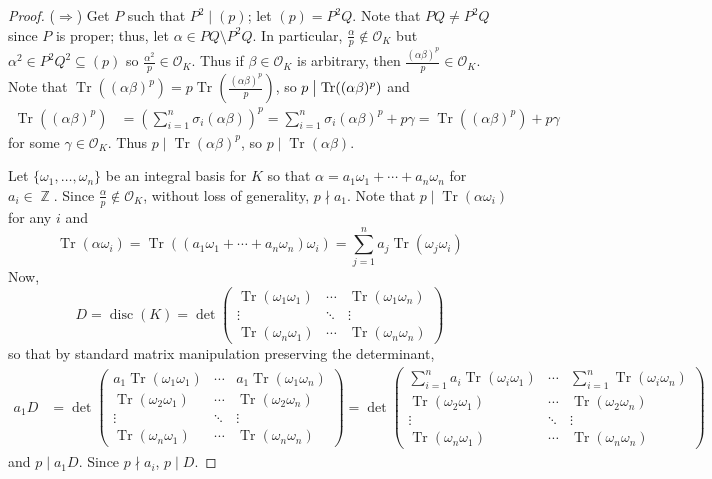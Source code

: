 \documentclass[11pt, a4paper]{memoir}
\DeclareMathOperator{\Z}{{\mathbb{Z}}}
\newcommand{\impr}{{($\Rightarrow$)\hspace{0.2cm}}}
\renewcommand{\div}{\bigm|}
\theoremstyle{change}
\theoremstyle{plain}
\theoremstyle{nonumberplain}
\newtheorem{proof}{Proof}
\DeclareMathOperator{\disc}{disc}
\DeclareMathOperator{\Tr}{Tr}
\numberwithin{equation}{section}
\begin{document}
\begin{proof}
    \impr
    Get $P$ such that $P^2\mid(p)$; let $(p)=P^2Q$.
    Note that $PQ\neq  P^2Q$ since $P$ is proper; thus, let $\alpha\in PQ\setminus P^2Q$.
    In particular, $\frac{\alpha}{p}\notin\mathcal{O}_K$ but $\alpha^2\in P^2Q^2\subseteq (p)$ so $\frac{\alpha^2}{p}\in\mathcal{O}_K$.
    Thus if $\beta\in\mathcal{O}_K$ is arbitrary, then $\frac{(\alpha\beta)^p}{p}\in\mathcal{O}_K$.
    Note that $\Tr((\alpha\beta)^p)=p\Tr\left(\frac{(\alpha\beta)^p}{p}\right)$, so $p\div \Tr((\alpha\beta)^p)$ and
    \begin{align*}
        \Tr\left((\alpha\beta)^p\right) &=\left(\sum_{i=1}^n\sigma_i(\alpha\beta)\right)^p=\sum_{i=1}^n\sigma_i(\alpha\beta)^p+p\gamma= \Tr((\alpha\beta)^p)+p\gamma
    \end{align*}
    for some $\gamma\in\mathcal{O}_K$.
    Thus $p\mid\Tr(\alpha\beta)^p$, so $p\mid\Tr(\alpha\beta)$.

    Let $\{\omega_1,\ldots,\omega_n\}$ be an integral basis for $K$ so that $\alpha=a_1\omega_1+\cdots+a_n\omega_n$ for $a_i\in\Z$.
    Since $\frac{\alpha}{p}\notin\mathcal{O}_K$, without loss of generality, $p\nmid a_1$.
    Note that $p\mid\Tr(\alpha\omega_i)$ for any $i$ and
    \begin{equation*}
        \Tr(\alpha\omega_i)=\Tr((a_1\omega_1+\cdots+a_n\omega_n)\omega_i)=\sum_{j=1}^n a_j\Tr(\omega_j\omega_i)
    \end{equation*}
    Now,
    \begin{equation*}
        D=\disc(K)=\det
        \begin{pmatrix}
            \Tr(\omega_1\omega_1) &\cdots&\Tr(\omega_1\omega_n)\\
            \vdots&\ddots&\vdots\\
            \Tr(\omega_n\omega_1) &\cdots&\Tr(\omega_n\omega_n)
        \end{pmatrix}
    \end{equation*}
    so that by standard matrix manipulation preserving the determinant,
    \begin{align*}
        a_1D &=\det
        \begin{pmatrix}
            a_1\Tr(\omega_1\omega_1) &\cdots&a_1\Tr(\omega_1\omega_n)\\
            \Tr(\omega_2\omega_1) &\cdots&\Tr(\omega_2\omega_n)\\
            \vdots&\ddots&\vdots\\
            \Tr(\omega_n\omega_1) &\cdots&\Tr(\omega_n\omega_n)
        \end{pmatrix}
        =\det
        \begin{pmatrix}
            \sum_{i=1}^n a_i\Tr(\omega_i\omega_1) &\cdots & \sum_{i=1}^n\Tr(\omega_i\omega_n)\\
            \Tr(\omega_2\omega_1) &\cdots&\Tr(\omega_2\omega_n)\\
            \vdots&\ddots&\vdots\\
            \Tr(\omega_n\omega_1) &\cdots&\Tr(\omega_n\omega_n)
        \end{pmatrix}
    \end{align*}
    and $p\mid a_1D$.
    Since $p\nmid a_i$, $p\mid D$.


\end{proof}
\end{document}
